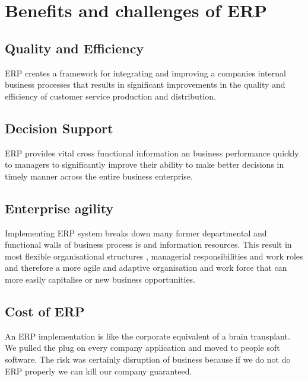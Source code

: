 \documentclass[twocolumn, 12pt, a4paper]{article}
\begin{document}
\section{Benefits and challenges of ERP}
\subsection{Quality and Efficiency}
ERP creates a framework for integrating and improving a companies internal business processes that results in significant improvements in the quality and efficiency of customer service production and distribution.

\subsection{Decision Support}
ERP provides vital cross functional information an business performance quickly to managers to significantly improve their ability to make better decisions in timely manner across the entire business enterprise.

\subsection{Enterprise agility}
Implementing ERP system breaks down many former departmental and functional walls of business process is and information resources. This result in most flexible organisational structures , managerial responsibilities and work roles and therefore a more agile and adaptive organisation and work force that can more easily capitalise or new business opportunities.

\subsection{Cost of ERP}
\vskip10pt
An ERP implementation is like the corporate equivalent of a brain transplant. We pulled the plug on every company application and moved to people soft software. The risk was certainly disruption of business because if we do not do ERP properly we can kill our company guaranteed.
\end{document}

